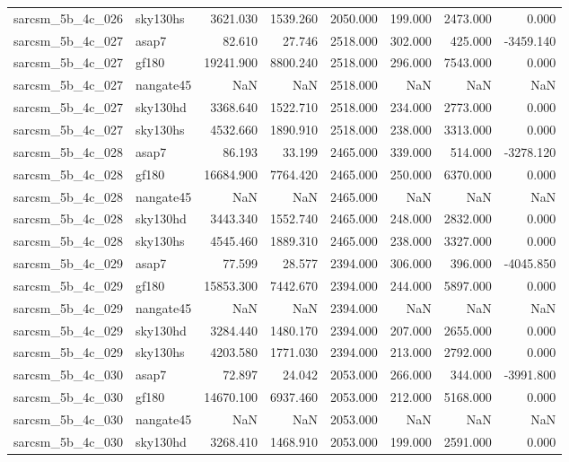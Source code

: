 \begin{tabular}{llrrrrrr}
sarcsm\_5b\_4c\_026 & sky130hs & 3621.030 & 1539.260 & 2050.000 & 199.000 & 2473.000 & 0.000 \\
sarcsm\_5b\_4c\_027 & asap7 & 82.610 & 27.746 & 2518.000 & 302.000 & 425.000 & -3459.140 \\
sarcsm\_5b\_4c\_027 & gf180 & 19241.900 & 8800.240 & 2518.000 & 296.000 & 7543.000 & 0.000 \\
sarcsm\_5b\_4c\_027 & nangate45 & NaN & NaN & 2518.000 & NaN & NaN & NaN \\
sarcsm\_5b\_4c\_027 & sky130hd & 3368.640 & 1522.710 & 2518.000 & 234.000 & 2773.000 & 0.000 \\
sarcsm\_5b\_4c\_027 & sky130hs & 4532.660 & 1890.910 & 2518.000 & 238.000 & 3313.000 & 0.000 \\
sarcsm\_5b\_4c\_028 & asap7 & 86.193 & 33.199 & 2465.000 & 339.000 & 514.000 & -3278.120 \\
sarcsm\_5b\_4c\_028 & gf180 & 16684.900 & 7764.420 & 2465.000 & 250.000 & 6370.000 & 0.000 \\
sarcsm\_5b\_4c\_028 & nangate45 & NaN & NaN & 2465.000 & NaN & NaN & NaN \\
sarcsm\_5b\_4c\_028 & sky130hd & 3443.340 & 1552.740 & 2465.000 & 248.000 & 2832.000 & 0.000 \\
sarcsm\_5b\_4c\_028 & sky130hs & 4545.460 & 1889.310 & 2465.000 & 238.000 & 3327.000 & 0.000 \\
sarcsm\_5b\_4c\_029 & asap7 & 77.599 & 28.577 & 2394.000 & 306.000 & 396.000 & -4045.850 \\
sarcsm\_5b\_4c\_029 & gf180 & 15853.300 & 7442.670 & 2394.000 & 244.000 & 5897.000 & 0.000 \\
sarcsm\_5b\_4c\_029 & nangate45 & NaN & NaN & 2394.000 & NaN & NaN & NaN \\
sarcsm\_5b\_4c\_029 & sky130hd & 3284.440 & 1480.170 & 2394.000 & 207.000 & 2655.000 & 0.000 \\
sarcsm\_5b\_4c\_029 & sky130hs & 4203.580 & 1771.030 & 2394.000 & 213.000 & 2792.000 & 0.000 \\
sarcsm\_5b\_4c\_030 & asap7 & 72.897 & 24.042 & 2053.000 & 266.000 & 344.000 & -3991.800 \\
sarcsm\_5b\_4c\_030 & gf180 & 14670.100 & 6937.460 & 2053.000 & 212.000 & 5168.000 & 0.000 \\
sarcsm\_5b\_4c\_030 & nangate45 & NaN & NaN & 2053.000 & NaN & NaN & NaN \\
sarcsm\_5b\_4c\_030 & sky130hd & 3268.410 & 1468.910 & 2053.000 & 199.000 & 2591.000 & 0.000 \\

\end{tabular}
